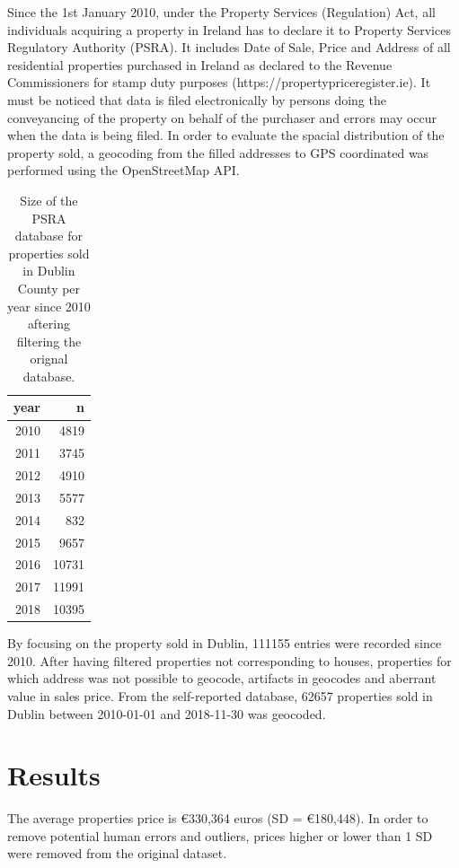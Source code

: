 \documentclass[]{elsarticle} %
\begin{document}
Since the 1st January 2010, under the Property Services (Regulation)
Act, all individuals acquiring a property in Ireland has to declare it
to Property Services Regulatory Authority (PSRA). It includes Date of
Sale, Price and Address of all residential properties purchased in
Ireland as declared to the Revenue Commissioners for stamp duty purposes
(https://propertypriceregister.ie). It must be noticed that data is
filed electronically by persons doing the conveyancing of the property
on behalf of the purchaser and errors may occur when the data is being
filed. In order to evaluate the spacial distribution of the property
sold, a geocoding from the filled addresses to GPS coordinated was
performed using the OpenStreetMap API.

\begin{table}[!h]

\caption{\label{tab:dublin-sample-size}Size of the PSRA database for properties sold in Dublin County per year since 2010 aftering filtering the orignal database.}
\centering
\fontsize{8}{10}\selectfont
\begin{tabular}{rr}
\toprule
year & n\\
\midrule
2010 & 4819\\
2011 & 3745\\
2012 & 4910\\
2013 & 5577\\
2014 & 832\\
2015 & 9657\\
2016 & 10731\\
2017 & 11991\\
2018 & 10395\\
\bottomrule
\end{tabular}
\end{table}

By focusing on the property sold in Dublin, 111155 entries were recorded
since 2010. After having filtered properties not corresponding to
houses, properties for which address was not possible to geocode,
artifacts in geocodes and aberrant value in sales price. From the
self-reported database, 62657 properties sold in Dublin between
2010-01-01 and 2018-11-30 was geocoded.

\hypertarget{results}{%
\section{Results}\label{results}}

The average properties price is €330,364 euros (SD = €180,448). In order
to remove potential human errors and outliers, prices higher or lower
than 1 SD were removed from the original dataset.
\end{document}
